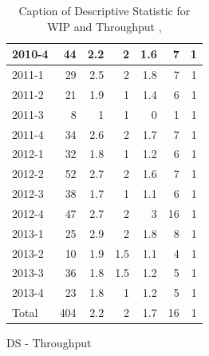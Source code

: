\documentclass[UKenglish]{ifimaster}  %
\begin{document}
\begin{appendices}
\begin{table}[!htbp]
\begin{adjustwidth}{-2.5cm}{}
\begin{subfigure}[b]{0.3\textwidth}
{\begin{tabular}{ | l | r | r | r | r | r | r | }
 2010-4  & 44 & 2.2 & 2 & 1.6 & 7 & 1 \\ \hline
 2011-1  & 29 & 2.5 & 2 & 1.8 & 7 & 1 \\ \hline
 2011-2  & 21 & 1.9 & 1 & 1.4 & 6 & 1 \\ \hline
 2011-3  & 8 & 1 & 1 & 0 &1 & 1 \\ \hline
 2011-4  & 34 & 2.6 & 2 & 1.7 & 7 & 1 \\ \hline
 2012-1  & 32 & 1.8 & 1 & 1.2 & 6 & 1 \\ \hline
 2012-2  & 52 & 2.7 & 2 & 1.6 & 7 & 1 \\ \hline
 2012-3  & 38 & 1.7 & 1 & 1.1 & 6 & 1 \\ \hline
 2012-4  & 47 & 2.7 & 2 & 3 & 16 & 1 \\ \hline
 2013-1  & 25 & 2.9 & 2 & 1.8 & 8 & 1 \\ \hline
 2013-2  & 10 & 1.9 & 1.5 & 1.1 & 4 & 1 \\ \hline
 2013-3  & 36 & 1.8 & 1.5 & 1.2 & 5 & 1 \\ \hline
 2013-4  & 23 & 1.8 & 1 & 1.2 & 5 & 1 \\ \hline
 Total  & 404 & 2.2 & 2 & 1.7 & 16 & 1 \\ \hline
\end{tabular}
}
\caption{DS - Throughput}
 \label{DS:Throughput:10}
\end{subfigure}
\end{adjustwidth}
\caption[Optional caption for list of figures]{Caption of Descriptive Statistic for WIP and Throughput  , }
\label{DS:10:1}
\end{table}


\end{appendices}
\end{document}
